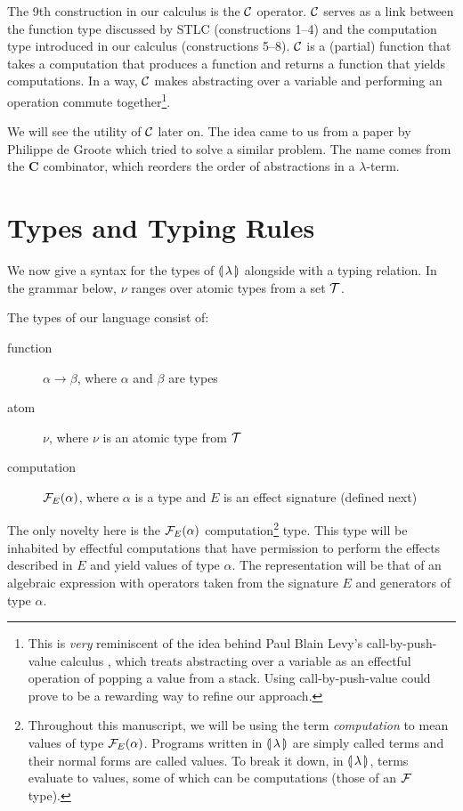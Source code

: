 \vspace{2em}

The 9th construction in our calculus is the $\mathcal{C}$ operator. $\mathcal{C}$ serves as
a link between the function type discussed by STLC (constructions 1--4) and
the computation type introduced in our calculus (constructions 5--8). $\mathcal{C}$
is a (partial) function that takes a computation that produces a function
and returns a function that yields computations. In a way, $\mathcal{C}$ makes
abstracting over a variable and performing an operation commute
together\footnote{This is \emph{very} reminiscent of the idea behind Paul
  Blain Levy's call-by-push-value calculus \cite{levy1999call}, which
  treats abstracting over a variable as an effectful operation of popping a
  value from a stack. Using call-by-push-value could prove to be a
  rewarding way to refine our approach.}.

We will see the utility of $\mathcal{C}$ later on. The idea came to us from a paper
by Philippe de Groote \cite{degroote2015conservativity} which tried to
solve a similar problem. The name comes from the $\mathbf{C}$ combinator,
which reorders the order of abstractions in a $\lambda$-term.


\section{Types and Typing Rules}
\label{sec:types}

We now give a syntax for the types of ${\llparenthesis \, \lambda \, \rrparenthesis}$ alongside with a typing
relation. In the grammar below, $\nu$ ranges over atomic types from a set
$\mathcal{T}$.

The types of our language consist of:
\begin{description}
\item[function] $\alpha \to \beta$, where $\alpha$ and $\beta$ are types
\item[atom] $\nu$, where $\nu$ is an atomic type from $\mathcal{T}$
\item[computation] $\mathcal{F}_E(\alpha)$, where $\alpha$ is a type and $E$ is an
  effect signature (defined next)
\end{description}

The only novelty here is the $\mathcal{F}_E(\alpha)$
computation\footnote{Throughout this manuscript, we will be using the term
  \emph{computation} to mean values of type $\mathcal{F}_E(\alpha)$. Programs
  written in ${\llparenthesis \, \lambda \, \rrparenthesis}$ are simply called terms and their normal forms
  are called values. To break it down, in ${\llparenthesis \, \lambda \, \rrparenthesis}$, terms evaluate to
  values, some of which can be computations (those of an $\mathcal{F}$ type).}
type. This type will be inhabited by effectful computations that have
permission to perform the effects described in $E$ and yield values of type
$\alpha$. The representation will be that of an algebraic expression with
operators taken from the signature $E$ and generators of type $\alpha$.

